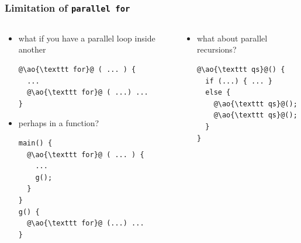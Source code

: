 \documentclass[12pt,dvipdfmx]{beamer}
\newcommand{\ao}[1]{{\color{blue}#1}}
\begin{document}
\begin{frame}[fragile]
\frametitle{Limitation of \texttt{parallel for}}
\begin{columns}
\begin{column}{0.5\textwidth}
\begin{itemize}
\item what if you have a parallel loop inside another
\begin{lstlisting}
@\ao{\texttt for}@ ( ... ) {
  ...
  @\ao{\texttt for}@ ( ...) ...
}
\end{lstlisting}

\item perhaps in a function?
\begin{lstlisting}
main() {
  @\ao{\texttt for}@ ( ... ) {
    ...
    g();
  }
}
g() { 
  @\ao{\texttt for}@ (...) ...
}
\end{lstlisting}
\end{itemize}
\end{column}
  
\begin{column}{0.5\textwidth}
\begin{itemize}
\item what about parallel recursions?
\begin{lstlisting}
@\ao{\texttt qs}@() {
  if (...) { ... }
  else {
    @\ao{\texttt qs}@();
    @\ao{\texttt qs}@();
  }
}      
\end{lstlisting}
\end{itemize}

\begin{center}
\end{center}

\end{column}
\end{columns}
\end{frame}
\end{document}
